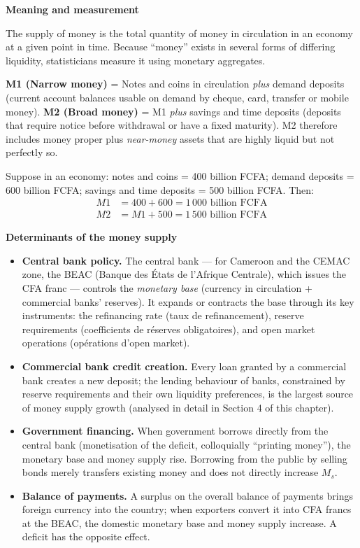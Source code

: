 \documentclass[11pt]{article}
\newcommand{\cle}[1]{{\popxbold\color{popdark}#1}}
\newcounter{popsec}
\newcounter{popsub}
\newcommand{\courssub}[1]{%
  \stepcounter{popsub}%
  \par\vspace{9pt}\noindent{\popxbold\fontsize{11.5}{13}\selectfont\color{popink}{\color{poporange}\thepopsec.\thepopsub}\hspace{6pt}#1}\par\nopagebreak\vspace{4pt}
}
\begin{document}
\courssub{The Supply of Money}

\textbf{Meaning and measurement}\par
The \cle{supply of money} is the total quantity of money in circulation in an economy at a given point in time. Because ``money'' exists in several forms of differing liquidity, statisticians measure it using \cle{monetary aggregates}.

\begin{definition}
\textbf{M1 (Narrow money)} = Notes and coins in circulation \emph{plus} demand deposits (current account balances usable on demand by cheque, card, transfer or mobile money). \textbf{M2 (Broad money)} = M1 \emph{plus} savings and time deposits (deposits that require notice before withdrawal or have a fixed maturity). M2 therefore includes money proper plus \emph{near-money} assets that are highly liquid but not perfectly so.
\end{definition}

\begin{exemplebox}
Suppose in an economy: notes and coins = 400 billion FCFA; demand deposits = 600 billion FCFA; savings and time deposits = 500 billion FCFA. Then:
\begin{align*}
M1 &= 400 + 600 = 1\,000 \text{ billion FCFA}\\
M2 &= M1 + 500 = 1\,500 \text{ billion FCFA}
\end{align*}
\end{exemplebox}

\textbf{Determinants of the money supply}\par
\begin{itemize}
\item \textbf{Central bank policy.} The central bank --- for Cameroon and the CEMAC zone, the \cle{BEAC} (Banque des \'Etats de l'Afrique Centrale), which issues the CFA franc --- controls the \emph{monetary base} (currency in circulation + commercial banks' reserves). It expands or contracts the base through its key instruments: the refinancing rate (taux de refinancement), reserve requirements (coefficients de r\'eserves obligatoires), and open market operations (op\'erations d'open market).
\item \textbf{Commercial bank credit creation.} Every loan granted by a commercial bank creates a new deposit; the lending behaviour of banks, constrained by reserve requirements and their own liquidity preferences, is the largest source of money supply growth (analysed in detail in Section 4 of this chapter).
\item \textbf{Government financing.} When government borrows directly from the central bank (monetisation of the deficit, colloquially ``printing money''), the monetary base and money supply rise. Borrowing from the public by selling bonds merely transfers existing money and does not directly increase $M_s$.
\item \textbf{Balance of payments.} A surplus on the overall balance of payments brings foreign currency into the country; when exporters convert it into CFA francs at the BEAC, the domestic monetary base and money supply increase. A deficit has the opposite effect.
\end{itemize}
\end{document}
